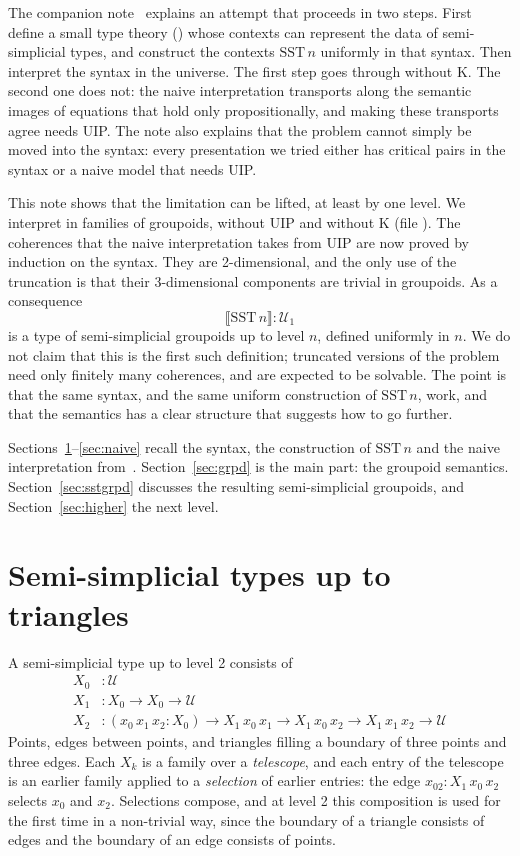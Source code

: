 \documentclass[11pt]{article}
\newcommand{\ag}[1]{\texttt{\detokenize{#1}}}
\newcommand{\repourl}{https://github.com/txa/sst-new}
\newcommand{\agfile}[1]{\href{\repourl/blob/main/#1}{\ag{#1}}}
\begin{document}
The companion note~\cite{obstruction} explains an attempt that proceeds in
two steps. First define a small type theory (\ag{TT}) whose contexts can
represent the data of semi-simplicial types, and construct the contexts
$\mathrm{SST}\,n$ uniformly in that syntax. Then interpret the syntax in the
universe. The first step goes through without K. The second one does not:
the naive interpretation transports along the semantic images of equations
that hold only propositionally, and making these transports agree needs UIP.
The note also explains that the problem cannot simply be moved into the
syntax: every presentation we tried either has critical pairs in the syntax or
a naive model that needs UIP.

This note shows that the limitation can be lifted, at least by one level.
We interpret \ag{TT} in families of groupoids, without UIP and without K
(file \agfile{experiments/sem1/Sem1.agda}). The coherences that the naive
interpretation takes from UIP are now proved by induction on the syntax. They
are 2-dimensional, and the only use of the truncation is that their
3-dimensional components are trivial in groupoids. As a consequence
\[
\llbracket\mathrm{SST}\,n\rrbracket : \mathcal U_1
\]
is a type of semi-simplicial groupoids up to level $n$, defined uniformly in
$n$. We do not claim that this is the first such definition; truncated
versions of the problem need only finitely many coherences, and are expected
to be solvable. The point is that the same syntax, and the same uniform
construction of $\mathrm{SST}\,n$, work, and that the semantics has a clear
structure that suggests how to go further.

Sections~\ref{sec:sst}--\ref{sec:naive} recall the syntax, the construction of
$\mathrm{SST}\,n$ and the naive interpretation from~\cite{obstruction}.
Section~\ref{sec:grpd} is the main part: the groupoid semantics.
Section~\ref{sec:sstgrpd} discusses the resulting semi-simplicial groupoids,
and Section~\ref{sec:higher} the next level.

\section{Semi-simplicial types up to triangles}\label{sec:sst}

A semi-simplicial type up to level 2 consists of
\begin{align*}
X_0 &: \mathcal U\\
X_1 &: X_0 \to X_0 \to \mathcal U\\
X_2 &: (x_0\,x_1\,x_2 : X_0) \to X_1\,x_0\,x_1 \to X_1\,x_0\,x_2 \to X_1\,x_1\,x_2 \to \mathcal U
\end{align*}
Points, edges between points, and triangles filling a boundary of three
points and three edges. Each $X_k$ is a family over a \emph{telescope}, and
each entry of the telescope is an earlier family applied to a
\emph{selection} of earlier entries: the edge $x_{02} : X_1\,x_0\,x_2$
selects $x_0$ and $x_2$. Selections compose, and at level 2 this composition
is used for the first time in a non-trivial way, since the boundary of a
triangle consists of edges and the boundary of an edge consists of points.
\end{document}
